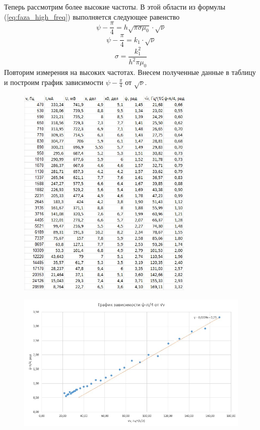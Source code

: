 \documentclass[a4paper,12pt]{article}
\begin{document}
Теперь рассмотрим более высокие частоты. В этой области из формулы (\ref{eq:faza_high_freq}) выполняется следующее равенство
\[\psi - \frac{\pi}{4} = h\sqrt{\pi \sigma \mu_0} \cdot \sqrt{\nu}\]
\[\psi - \frac{\pi}{4} = k_1 \cdot \sqrt{\nu}\]
\[\sigma = \frac{k_1^2}{h^2\pi \mu_0}\]
Повторим измерения на высоких частотах. Внесем полученные данные в таблицу и построим график зависимости $\psi - \frac{\pi}{4}$ от $\sqrt{\nu}$.

\begin{figure}[H]
	\begin{center}	\includegraphics[width=0.75\textwidth]{tabliza3.jpg}
	\end{center}
\end{figure}

\begin{figure}[H]
	\begin{center}	\includegraphics[width=1\textwidth]{graphik3.jpg}
	\end{center}
\end{figure}
\end{document}
